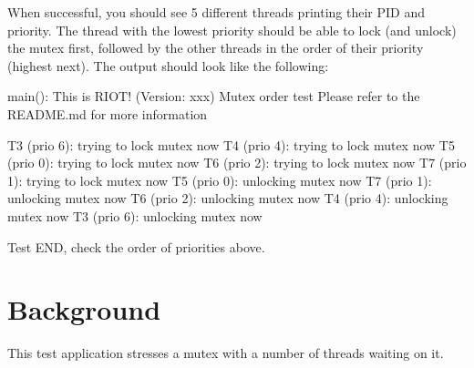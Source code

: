 When successful, you should see 5 different threads printing their P\+ID and priority. The thread with the lowest priority should be able to lock (and unlock) the mutex first, followed by the other threads in the order of their priority (highest next). The output should look like the following\+:


\begin{DoxyCode}
main(): This is RIOT! (Version: xxx)
Mutex order test
Please refer to the README.md for more information

T3 (prio 6): trying to lock mutex now
T4 (prio 4): trying to lock mutex now
T5 (prio 0): trying to lock mutex now
T6 (prio 2): trying to lock mutex now
T7 (prio 1): trying to lock mutex now
T5 (prio 0): unlocking mutex now
T7 (prio 1): unlocking mutex now
T6 (prio 2): unlocking mutex now
T4 (prio 4): unlocking mutex now
T3 (prio 6): unlocking mutex now

Test END, check the order of priorities above.
\end{DoxyCode}


\section*{Background }

This test application stresses a mutex with a number of threads waiting on it. 